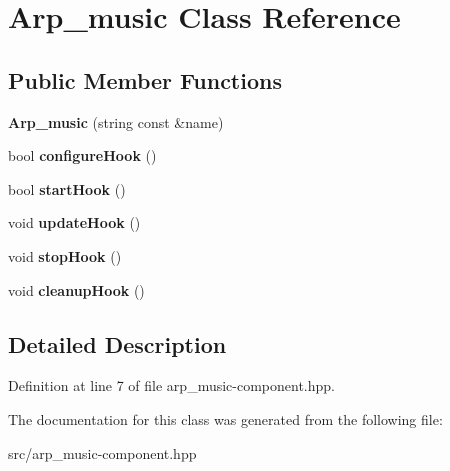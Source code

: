 \hypertarget{classArp__music}{
\section{Arp\_\-music Class Reference}
\label{classArp__music}
}
\subsection*{Public Member Functions}
\begin{DoxyCompactItemize}
\item 
\hypertarget{classArp__music_aedb885d57ccff0d579645f7920f64570}{
{\bfseries Arp\_\-music} (string const \&name)}
\label{classArp__music_aedb885d57ccff0d579645f7920f64570}

\item 
\hypertarget{classArp__music_a0b231ec9a215ef314afebe5968f4de06}{
bool {\bfseries configureHook} ()}
\label{classArp__music_a0b231ec9a215ef314afebe5968f4de06}

\item 
\hypertarget{classArp__music_ababf8c5210afebf53e2698010cad7b74}{
bool {\bfseries startHook} ()}
\label{classArp__music_ababf8c5210afebf53e2698010cad7b74}

\item 
\hypertarget{classArp__music_a0558134b1853392824fea86521773f67}{
void {\bfseries updateHook} ()}
\label{classArp__music_a0558134b1853392824fea86521773f67}

\item 
\hypertarget{classArp__music_a911567c78e93e5c45b79d43be7fa0004}{
void {\bfseries stopHook} ()}
\label{classArp__music_a911567c78e93e5c45b79d43be7fa0004}

\item 
\hypertarget{classArp__music_a0653150ac177e6c6b9e8955a23d7e22f}{
void {\bfseries cleanupHook} ()}
\label{classArp__music_a0653150ac177e6c6b9e8955a23d7e22f}

\end{DoxyCompactItemize}


\subsection{Detailed Description}


Definition at line 7 of file arp\_\-music-\/component.hpp.



The documentation for this class was generated from the following file:\begin{DoxyCompactItemize}
\item 
src/arp\_\-music-\/component.hpp\end{DoxyCompactItemize}
